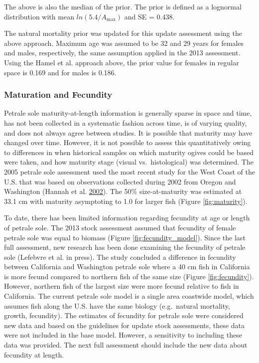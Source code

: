 \documentclass[12pt,]{article}
\begin{document}
The above is also the median of the prior. The prior is defined as a
lognormal distribution with mean \(ln(5.4/A_{\text{max}})\) and SE =
0.438.

The natural mortality prior was updated for this update assessment using
the above approach. Maximum age was assumed to be 32 and 29 years for
females and males, respectively, the same assumption applied in the 2013
assessment. Using the Hamel et al. approach above, the prior value for
females in regular space is 0.169 and for males is 0.186.

\subsubsection{Maturation and Fecundity}\label{maturation-and-fecundity}

Petrale sole maturity-at-length information is generally sparse in space
and time, has not been collected in a systematic fashion across time, is
of varying quality, and does not always agree between studies. It is
possible that maturity may have changed over time. However, it is not
possible to assess this quantitatively owing to differences in when
historical samples on which maturity ogives could be based were taken,
and how maturity stage (visual vs.~histological) was determined. The
2005 petrale sole assessment used the most recent study for the West
Coast of the U.S. that was based on observations collected during 2002
from Oregon and Washington (Hannah et al.
\protect\hyperlink{ref-hannah_length_2002}{2002}). The 50\%
size-at-maturity was estimated at 33.1 cm with maturity asymptoting to
1.0 for larger fish (Figure \ref{fig:maturity}).

To date, there has been limited information regarding fecundity at age
or length of petrale sole. The 2013 stock assessment assumed that
fecundity of female petrale sole was equal to biomass (Figure
\ref{fig:fecundity_model}). Since the last full assessment, new research
has been done examining the fecundity of petrale sole (Lefebvre et al.
in press). The study concluded a difference in fecundity between
California and Washington petrale sole where a 40 cm fish in California
is more fecund compared to northern fish of the same size (Figure
\ref{fig:fecundity}). However, northern fish of the largest size were
more fecund relative to fish in California. The current petrale sole
model is a single area coastwide model, which assumes fish along the
U.S. have the same biology (e.g.~natural mortality, growth, fecundity).
The estimates of fecundity for petrale sole were considered new data and
based on the guidelines for update stock assessments, these data were
not included in the base model. However, a sensitivity to including
these data was provided. The next full assessment should include the new
data about fecundity at length.
\end{document}
